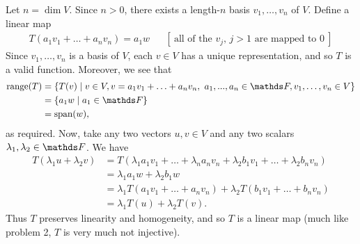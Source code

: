 \documentclass{homework}
\begin{document}
\begin{solution}
  Let $n=\dim V$. Since $n>0$, there exists a length-$n$ basis $v_1,\ldots,v_n$ of $V$. Define a
  linear map
  \begin{align*}
    T(a_1v_1+\ldots+a_nv_n)=a_1w&& [~\text{all of the $v_j$, $j>1$ are mapped to $0$}~]
  \end{align*}
  Since $v_1,\ldots,v_n$ is a basis of $V$, each $v\in V$ has a unique representation, and so $T$ is
  a valid function. Moreover, we see that
  \begin{align*}
    \range(T) &= \{T(v)\mid v\in V, v=a_1v_1+\ldots+a_nv_n,\ a_1,...,a_n\in \F, v_1,\ldots,v_n\in V\}  \\
              &= \{a_1w\mid a_1\in \F \} \\
              &= \Span(w)
  ,\end{align*} as required.
  Now, take any two vectors $u,v\in V$ and any two scalars $\lambda_1,\lambda_2\in \F$. We have
  \begin{align*}
    T(\lambda_1u+\lambda_2v)&=
    T(\lambda_1a_1v_1+\ldots+\lambda_na_nv_n+\lambda_2b_1v_1+\ldots+\lambda_2b_nv_n) \\
                            &= \lambda_1a_1w+\lambda_2b_1w\\
                            &=\lambda_1T(a_1v_1+\ldots+a_nv_n)+\lambda_2T(b_1v_1+\ldots+b_nv_n)\\
                            &= \lambda_1T(u)+\lambda_2T(v)
  .\end{align*}
  Thus $T$ preserves linearity and homogeneity, and so $T$ is
  a linear map (much like problem 2, $T$ is very much not injective).
\end{solution}
\end{document}
